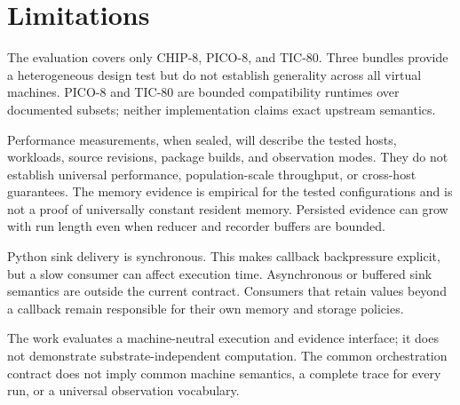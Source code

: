 \section{Limitations}

The evaluation covers only CHIP-8, PICO-8, and TIC-80. Three bundles provide
a heterogeneous design test but do not establish generality across all
virtual machines. PICO-8 and TIC-80 are bounded compatibility runtimes over
documented subsets; neither implementation claims exact upstream semantics.

Performance measurements, when sealed, will describe the tested hosts,
workloads, source revisions, package builds, and observation modes. They do
not establish universal performance, population-scale throughput, or
cross-host guarantees. The memory evidence is empirical for the tested
configurations and is not a proof of universally constant resident memory.
Persisted evidence can grow with run length even when reducer and recorder
buffers are bounded.

Python sink delivery is synchronous. This makes callback backpressure
explicit, but a slow consumer can affect execution time. Asynchronous or
buffered sink semantics are outside the current contract. Consumers that
retain values beyond a callback remain responsible for their own memory and
storage policies.

The work evaluates a machine-neutral execution and evidence interface; it
does not demonstrate substrate-independent computation. The common
orchestration contract does not imply common machine semantics, a complete
trace for every run, or a universal observation vocabulary.
